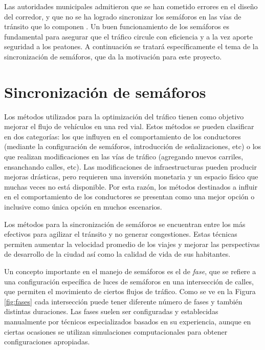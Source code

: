Las autoridades municipales admitieron que se han cometido errores en el diseño del corredor, y que no se ha logrado sincronizar los semáforos en las vías de tránsito que lo componen \citep{olivera2013}. Un buen funcionamiento de los semáforos es fundamental para asegurar que el tráfico circule con eficiencia y a la vez aporte seguridad a los peatones. A continuación se tratará específicamente el tema de la sincronización de semáforos, que da la motivación para este proyecto. 


\section{Sincronización de semáforos}
Los métodos utilizados para la optimización del tráfico tienen como objetivo mejorar el flujo de vehículos en una red vial. Estos métodos se pueden clasificar en dos categorías: los que influyen en el comportamiento de los conductores (mediante la configuración de semáforos, introducción de señalizaciones, etc) o los que realizan modificaciones en las vías de tráfico (agregando nuevos carriles, ensanchando calles, etc). Las modificaciones de infraestructuras pueden producir mejoras drásticas, pero requieren una inversión monetaria y un espacio físico que muchas veces no está disponible. Por esta razón, los métodos destinados a influir en el comportamiento de los conductores se presentan como una mejor opción o inclusive como única opción en muchos escenarios.

Los métodos para la sincronización de semáforos se encuentran entre los más efectivos para agilizar el tránsito y no generar congestiones. Estas técnicas permiten aumentar la velocidad promedio de los viajes y mejorar las perspectivas de desarrollo de la ciudad así como la calidad de vida de sus habitantes. 

Un concepto importante en el manejo de semáforos es el de \emph{fase}, que se refiere a una configuración específica de luces de semáforos en una intersección de calles, que permiten el movimiento de ciertos flujos de tráfico. Como se ve en la Figura \ref{fig:fases} cada intersección puede tener diferente número de fases y también distintas duraciones. Las fases suelen ser configuradas y establecidas manualmente por técnicos especializados basados en su experiencia, aunque en ciertas ocasiones se utilizan simulaciones computacionales para obtener configuraciones apropiadas. 

